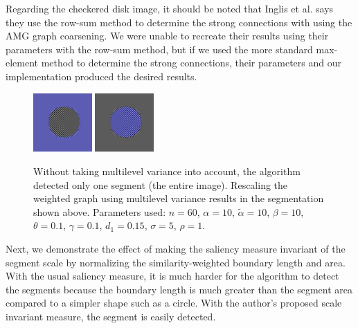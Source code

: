 \documentclass[12pt]{article}%
\begin{document}
Regarding the checkered disk image, it should be noted that Inglis et al. says they use the row-sum method to determine the strong connections with using the AMG graph coarsening.  We were unable to recreate their results using their parameters with the row-sum method, but if we used the more standard max-element method to determine the strong connections, their parameters and our implementation produced the desired results.\\

\begin{figure}[ht]
\centering
\includegraphics[width=0.2\textwidth,height=0.2\textwidth]{checker_disk_good_seg_1.png} \hspace{.45cm}
\includegraphics[width=0.2\textwidth,height=0.2\textwidth]{checker_disk_good_seg_2.png}
\caption{Without taking multilevel variance into account, the algorithm detected only one segment (the entire image). Rescaling the weighted graph using multilevel variance results in the segmentation shown above. Parameters used: $n = 60$, $\alpha = 10$, $\tilde{\alpha} = 10$, $\beta = 10$, $\theta = 0.1$, $\gamma = 0.1$, $d_1 = 0.15$, $\sigma = 5$, $\rho = 1$.}
\label{fig:disk}
\end{figure}

Next, we demonstrate the effect of making the saliency measure invariant of the segment scale by normalizing the similarity-weighted boundary length and area. With the usual saliency measure, it is much harder for the algorithm to detect the segments because the boundary length is much greater than the segment area compared to a simpler shape such as a circle. With the author's proposed scale invariant measure, the segment is easily detected.\\
\end{document}
